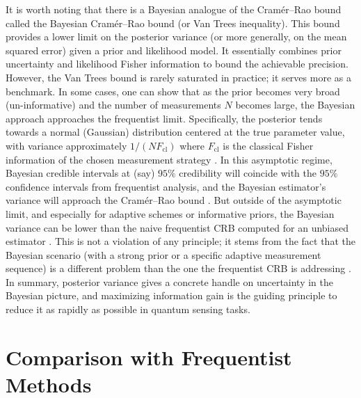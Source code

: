 It is worth noting that there is a Bayesian analogue of the Cramér–Rao
bound called the Bayesian Cramér–Rao bound (or Van Trees
inequality). This bound provides a lower limit on the posterior
variance (or more generally, on the mean squared error) given a prior
and likelihood model. It essentially combines prior uncertainty and
likelihood Fisher information to bound the achievable
precision. However, the Van Trees bound is rarely saturated in
practice; it serves more as a benchmark. In some cases, one can show
that as the prior becomes very broad (un-informative) and the number
of measurements $N$ becomes large, the Bayesian approach approaches
the frequentist limit. Specifically, the posterior tends towards a
normal (Gaussian) distribution centered at the true parameter value,
with variance approximately $1/(N F_{\text{cl}})$ where
$F_{\text{cl}}$ is the classical Fisher information of the chosen
measurement strategy . In this asymptotic regime, Bayesian credible
intervals at (say) $95\%$ credibility will coincide with the $95\%$
confidence intervals from frequentist analysis, and the Bayesian
estimator’s variance will approach the Cramér–Rao bound . But outside
of the asymptotic limit, and especially for adaptive schemes or
informative priors, the Bayesian variance can be lower than the naive
frequentist CRB computed for an unbiased estimator . This is not a
violation of any principle; it stems from the fact that the Bayesian
scenario (with a strong prior or a specific adaptive measurement
sequence) is a different problem than the one the frequentist CRB is
addressing . In summary, posterior variance gives a concrete handle on
uncertainty in the Bayesian picture, and maximizing information gain
is the guiding principle to reduce it as rapidly as possible in
quantum sensing tasks.



\section{Comparison with Frequentist Methods}

